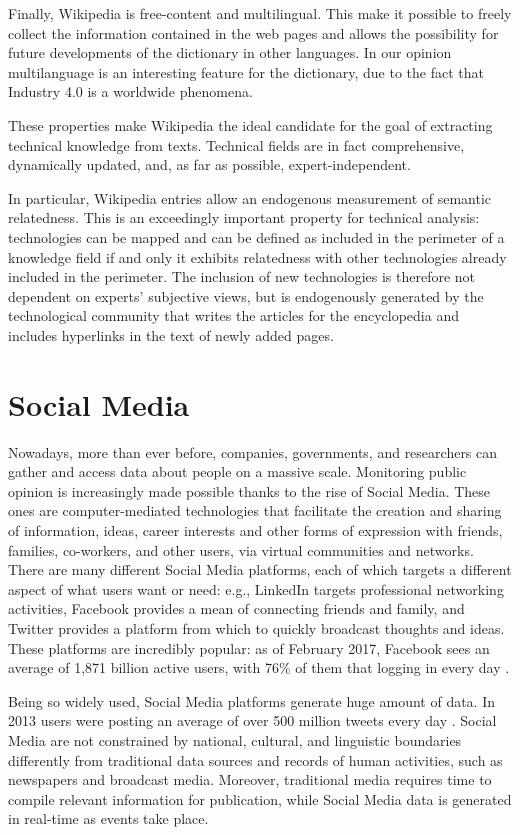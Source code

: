 \documentclass[]{book}
\theoremstyle{definition}
\theoremstyle{definition}
\theoremstyle{definition}
\theoremstyle{remark}
\begin{document}
Finally, Wikipedia is free-content and multilingual. This make it
possible to freely collect the information contained in the web pages
and allows the possibility for future developments of the dictionary in
other languages. In our opinion multilanguage is an interesting feature
for the dictionary, due to the fact that Industry 4.0 is a worldwide
phenomena.

These properties make Wikipedia the ideal candidate for the goal of
extracting technical knowledge from texts. Technical fields are in fact
comprehensive, dynamically updated, and, as far as possible,
expert-independent.

In particular, Wikipedia entries allow an endogenous measurement of
semantic relatedness. This is an exceedingly important property for
technical analysis: technologies can be mapped and can be defined as
included in the perimeter of a knowledge field if and only it exhibits
relatedness with other technologies already included in the perimeter.
The inclusion of new technologies is therefore not dependent on experts'
subjective views, but is endogenously generated by the technological
community that writes the articles for the encyclopedia and includes
hyperlinks in the text of newly added pages.

\section{Social Media}\label{sotadocumentstwitter}

Nowadays, more than ever before, companies, governments, and researchers
can gather and access data about people on a massive scale. Monitoring
public opinion is increasingly made possible thanks to the rise of
Social Media. These ones are computer-mediated technologies that
facilitate the creation and sharing of information, ideas, career
interests and other forms of expression with friends, families,
co-workers, and other users, via virtual communities and networks. There
are many different Social Media platforms, each of which targets a
different aspect of what users want or need: e.g., LinkedIn targets
professional networking activities, Facebook provides a mean of
connecting friends and family, and Twitter provides a platform from
which to quickly broadcast thoughts and ideas. These platforms are
incredibly popular: as of February 2017, Facebook sees an average of
1,871 billion active users, with 76\% of them that logging in every day
\citep{tuten2017social}.

Being so widely used, Social Media platforms generate huge amount of
data. In 2013 users were posting an average of over 500 million tweets
every day \citep{krikorian2013new}. Social Media are not constrained by
national, cultural, and linguistic boundaries differently from
traditional data sources and records of human activities, such as
newspapers and broadcast media. Moreover, traditional media requires
time to compile relevant information for publication, while Social Media
data is generated in real-time as events take place.
\end{document}

